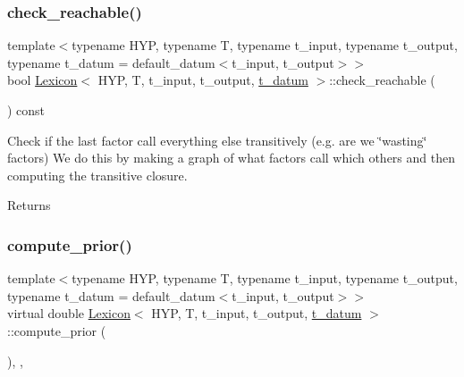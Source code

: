 \mbox{\label{class_lexicon_aeb3e5f9f75e43f2147a22dee67fc8527}} 
\subsubsection{\texorpdfstring{check\+\_\+reachable()}{check\_reachable()}}
{\footnotesize\ttfamily template$<$typename H\+YP, typename T, typename t\+\_\+input, typename t\+\_\+output, typename t\+\_\+datum = default\+\_\+datum$<$t\+\_\+input, t\+\_\+output$>$$>$ \\
bool \hyperlink{class_lexicon}{Lexicon}$<$ H\+YP, T, t\+\_\+input, t\+\_\+output, \hyperlink{class_bayesable_a7c93a2eeab708378eb321745908718d4}{t\+\_\+datum} $>$\+::check\+\_\+reachable (\begin{DoxyParamCaption}{ }\end{DoxyParamCaption}) const\hspace{0.3cm}{\ttfamily [inline]}}

Check if the last factor call everything else transitively (e.\+g. are we \char`\"{}wasting\char`\"{} factors) We do this by making a graph of what factors call which others and then computing the transitive closure. \begin{DoxyReturn}{Returns}

\end{DoxyReturn}
\mbox{\label{class_lexicon_a1edc72e7c3b422d1c13b6cc3eb33d08d}} 
\subsubsection{\texorpdfstring{compute\+\_\+prior()}{compute\_prior()}}
{\footnotesize\ttfamily template$<$typename H\+YP, typename T, typename t\+\_\+input, typename t\+\_\+output, typename t\+\_\+datum = default\+\_\+datum$<$t\+\_\+input, t\+\_\+output$>$$>$ \\
virtual double \hyperlink{class_lexicon}{Lexicon}$<$ H\+YP, T, t\+\_\+input, t\+\_\+output, \hyperlink{class_bayesable_a7c93a2eeab708378eb321745908718d4}{t\+\_\+datum} $>$\+::compute\+\_\+prior (\begin{DoxyParamCaption}{ }\end{DoxyParamCaption})\hspace{0.3cm}{\ttfamily [inline]}, {\ttfamily [override]}, {\ttfamily [virtual]}}



